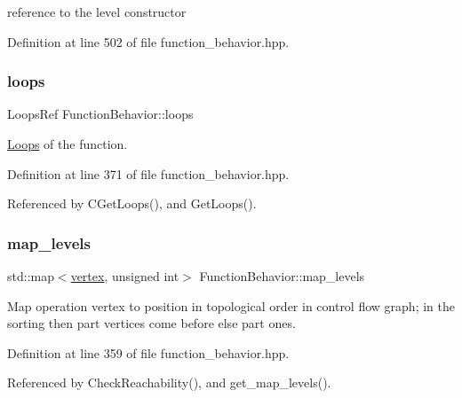 reference to the level constructor 



Definition at line 502 of file function\+\_\+behavior.\+hpp.

\mbox{\label{classFunctionBehavior_a5a4d4b1795a375ac823960e5fa89a006}} 
\subsubsection{\texorpdfstring{loops}{loops}}
{\footnotesize\ttfamily Loops\+Ref Function\+Behavior\+::loops\hspace{0.3cm}{\ttfamily [private]}}



\hyperlink{classLoops}{Loops} of the function. 



Definition at line 371 of file function\+\_\+behavior.\+hpp.



Referenced by C\+Get\+Loops(), and Get\+Loops().

\mbox{\label{classFunctionBehavior_afb880ba64de5761152258b08528d5e1c}} 
\subsubsection{\texorpdfstring{map\+\_\+levels}{map\_levels}}
{\footnotesize\ttfamily std\+::map$<$\hyperlink{graph_8hpp_abefdcf0544e601805af44eca032cca14}{vertex}, unsigned int$>$ Function\+Behavior\+::map\+\_\+levels\hspace{0.3cm}{\ttfamily [private]}}



Map operation vertex to position in topological order in control flow graph; in the sorting then part vertices come before else part ones. 



Definition at line 359 of file function\+\_\+behavior.\+hpp.



Referenced by Check\+Reachability(), and get\+\_\+map\+\_\+levels().

\mbox{\label{classFunctionBehavior_a854c16cc5d2ea8a0560effb9df72ef8f}} 
